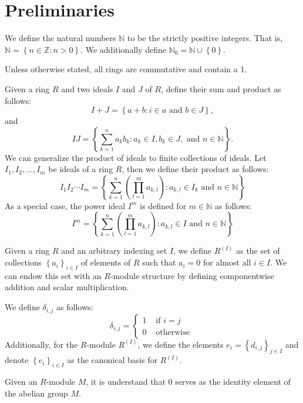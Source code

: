 \documentclass[12pt]{article}
\newcommand{\N}{\ensuremath{\mathbb{N}}}
\newcommand{\Z}{\ensuremath{\mathbb{Z}}}
\renewcommand{\d}{\ensuremath{\delta}}
\newcommand{\braceb}[1]{\left\{#1\right\}}
\newcommand{\parenb}[1]{\left(#1\right)}
\renewcommand{\t}[1]{\text{ #1 }}
\begin{document}
\pagestyle{fancy}

\setlength{\parindent}{0in}
\setlength{\parskip}{0.1in}

\section*{Preliminaries}

We define the natural numbers \( \N \) to be the strictly positive integers.
That is, \( \N = \braceb{n \in \Z : n > 0} \).
We additionally define \( \N_0 = \N \cup \braceb{0} \).

Unless otherwise stated, all rings are commutative and contain a 1.

Given a ring \( R \) and two ideals \( I \) and \( J \) of \( R \), define
their sum and product as follows:
\[
	I + J = \braceb{a + b : i \in a \t{and} b \in J},
\]
and
\[
	IJ = \braceb{
		\sum_{k = 1}^n a_kb_k : a_k \in I, b_k \in J, \t{and} n \in \N
	}.
\]
We can generalize the product of ideals to finite collections of ideals.
Let \( I_1, I_2, \dots, I_m \) be ideals of a ring \( R \), then we define
their product as follows:
\[
	I_1I_2 \cdots I_m = \braceb{
		\sum_{k = 1}^n \parenb{\prod_{l = 1}^m a_{k,l}}
		: a_{k,l} \in I_k \t{and} n \in \N
	}
\]
As a special case, the power ideal \( I^m \) is defined for \( m \in \N \) as
follows:
\[
	I^m = \braceb{
		\sum_{k = 1}^n \parenb{\prod_{l = 1}^m a_{k,l}}
		: a_{k,l} \in I \t{and} n \in \N
	}
\]

Given a ring \( R \) and an arbitrary indexing set \( I \), we define
\( R^{(I)} \) as the set of collections \( \braceb{a_i}_{i \in I} \) of
elements of \( R \) such that \( a_i = 0 \) for almost all \( i \in I \).
We can endow this set with an \( R \)-module structure by defining
componentwise addition and scalar multiplication.

We define \( \d_{i,j} \) as follows:
\[
	\d_{i,j} = \begin{cases}
		1 & \t{if} i = j  \\
		0 & \t{otherwise}
	\end{cases}
\]
Additionally, for the \( R \)-module \( R^{(I)} \), we define the elements
\( e_i = \braceb{d_{i,j}}_{j \in I} \) and denote
\( \braceb{e_i}_{i \in I} \) as the canonical basis for \( R^{(I)} \).

Given an \( R \)-module \( M \), it is understand that \( 0 \) serves as the
identity element of the abelian group \( M \).
\end{document}
